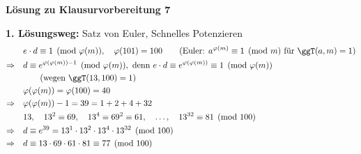 \textbf{Lösung zu Klausurvorbereitung 7}

\begin{loesung}
\textbf{1. Lösungsweg:} Satz von Euler, Schnelles Potenzieren
\begin{align*}
& e \cdot d \equiv 1 \pmod{\varphi(m)}, \quad \varphi(101) = 100 \qquad (\text{Euler: } a^{\varphi(m)} \equiv 1 \pmod m \text{ für } \ggT(a, m) = 1)\\
\Rightarrow\quad & d \equiv e^{\varphi(\varphi(m)) - 1} \pmod{\varphi(m)}, \text{ denn } e \cdot d \equiv e^{\varphi(\varphi(m))} \equiv 1 \pmod{\varphi(m)}\\ & \qquad (\text{wegen } \ggT(13, 100) = 1)\\
& \varphi(\varphi(m)) = \varphi(100) = 40\\
\Rightarrow\quad & \varphi(\varphi(m)) - 1 = 39 = 1 + 2 + 4 + 32\\
& 13,\quad 13^2 \equiv 69,\quad 13^4 \equiv 69^2 \equiv 61,\quad \dots,\quad 13^{32} \equiv 81 \pmod{100}\\
\Rightarrow\quad & d \equiv e^{39} = 13^{1} \cdot 13^{2} \cdot 13^{4} \cdot 13^{32} \pmod{100}\\
\Rightarrow\quad & d \equiv 13 \cdot 69 \cdot 61 \cdot 81 \equiv 77 \pmod{100}
\end{align*}


\end{loesung}
